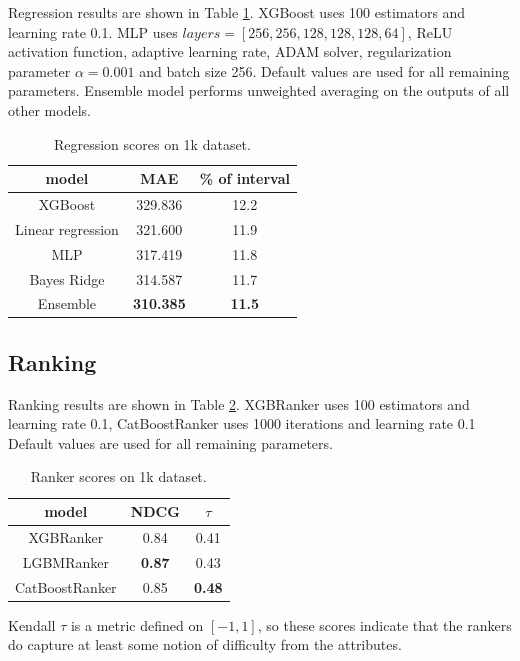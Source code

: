 \documentclass[sigconf,nonacm]{acmart}
\begin{document}
Regression results are shown in Table \ref{regression}. XGBoost uses 100 estimators and learning rate 0.1. MLP uses $layers=[256, 256, 128, 128, 128, 64]$, ReLU activation function,  adaptive learning rate, ADAM solver, regularization parameter $\alpha=0.001$ and batch size 256. Default values are used for all remaining parameters. Ensemble model performs unweighted averaging on the outputs of all other models. 

\begin{center}
\begin{table}[!ht]
\caption{Regression scores on 1k dataset.
\label{regression}}
\centering
{\begin{tabular}{c|c|c}
model & MAE & \% of interval  \\ \hline
XGBoost & 329.836 & 12.2 \\
Linear regression & 321.600 & 11.9  \\
MLP & 317.419 & 11.8 \\
Bayes Ridge & 314.587 & 11.7 \\
Ensemble & \textbf{310.385} & \textbf{11.5} \\
\end{tabular}}
\end{table}
\end{center}

\subsection{Ranking}

Ranking results are shown in Table \ref{ranking}. XGBRanker uses 100 estimators and learning rate 0.1, CatBoostRanker uses 1000 iterations and learning rate 0.1 Default values are used for all remaining parameters. 

\begin{center}
\begin{table}[!ht]
\caption{Ranker scores on 1k dataset.
\label{ranking}}
\centering
{\begin{tabular}{c|c|c}
model & NDCG & $\tau$  \\ \hline
XGBRanker & 0.84 & 0.41  \\
LGBMRanker & \textbf{0.87} & 0.43  \\
CatBoostRanker & 0.85 & \textbf{0.48} \\
\end{tabular}}
\end{table}
\end{center}

Kendall $\tau$ is a metric defined on $[-1, 1]$, so these scores indicate that the rankers do capture at least some notion of difficulty from the attributes. 
\end{document}
